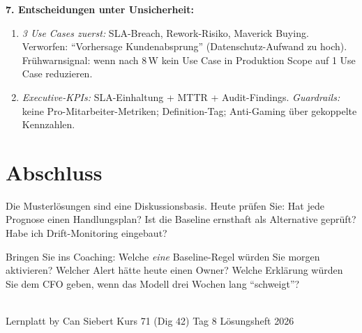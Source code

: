 \documentclass[11pt,a4paper,oneside]{article}
\begin{document}
\begin{loesungbox}
\smallskip
\textbf{7. Entscheidungen unter Unsicherheit:}
\begin{enumerate}
  \item \emph{3 Use Cases zuerst:} SLA-Breach, Rework-Risiko, Maverick Buying. Verworfen: ``Vorhersage Kundenabsprung'' (Datenschutz-Aufwand zu hoch). Fr\"uhwarnsignal: wenn nach 8\,W kein Use Case in Produktion \textrightarrow{} Scope auf 1 Use Case reduzieren.
  \item \emph{Executive-KPIs:} SLA-Einhaltung + MTTR + Audit-Findings. \emph{Guardrails:} keine Pro-Mitarbeiter-Metriken; Definition-Tag; Anti-Gaming \"uber gekoppelte Kennzahlen.
\end{enumerate}
\end{loesungbox}

\clearpage

\section*{Abschluss}
\thispagestyle{plain}

\noindent Die Musterl\"osungen sind eine Diskussionsbasis. Heute pr\"ufen Sie: Hat jede Prognose einen Handlungsplan? Ist die Baseline ernsthaft als Alternative gepr\"uft? Habe ich Drift-Monitoring eingebaut?

\medskip
\begin{infobox}
Bringen Sie ins Coaching: Welche \emph{eine} Baseline-Regel w\"urden Sie morgen aktivieren? Welcher Alert h\"atte heute einen Owner? Welche Erkl\"arung w\"urden Sie dem CFO geben, wenn das Modell drei Wochen lang ``schweigt''?
\end{infobox}

\vspace{1cm}
\noindent{\color{lpAccent}\rule{\linewidth}{0.6pt}}\\[4pt]
{\footnotesize\sffamily\color{lpGray}Lernplatt \textperiodcentered{} by Can Siebert \textperiodcentered{} Kurs 71 (Dig 42) \textperiodcentered{} Tag 8 \textperiodcentered{} L\"osungsheft \textperiodcentered{} \textcopyright{} 2026}
\end{document}
